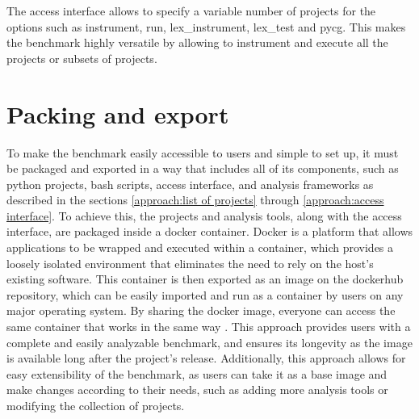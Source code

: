 The access interface allows to specify a variable number of projects for the options such as instrument, run, lex\_instrument, lex\_test and pycg. This makes the benchmark highly versatile by allowing to instrument and execute all the projects or subsets of projects.

\section{Packing and export}
\label{approach: packing and exporting}
To make the benchmark easily accessible to users and simple to set up, it must be packaged and exported in a way that includes all of its components, such as python projects, bash scripts, access interface, and analysis frameworks as described in the sections \ref{approach:list of projects} through \ref{approach:access interface}. To achieve this, the projects and analysis tools, along with the access interface, are packaged inside a docker container. Docker is a platform that allows applications to be wrapped and executed within a container, which provides a loosely isolated environment that eliminates the need to rely on the host's existing software. This container is then exported as an image on the dockerhub repository, which can be easily imported and run as a container by users on any major operating system. By sharing the docker image, everyone can access the same container that works in the same way \cite{Docker_2022}. This approach provides users with a complete and easily analyzable benchmark, and ensures its longevity as the image is available long after the project's release. Additionally, this approach allows for easy extensibility of the benchmark, as users can take it as a base image and make changes according to their needs, such as adding more analysis tools or modifying the collection of projects.

